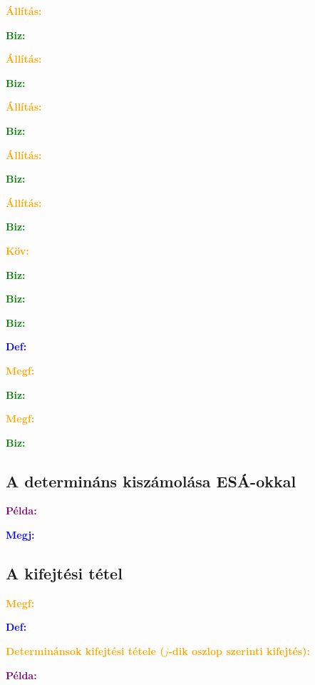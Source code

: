 \documentclass[../szamtud.tex]{subfiles}
\begin{document}
        \textcolor{orange}{\textbf{Állítás:}}

        \textcolor{green}{\textbf{Biz:}}

        \textcolor{orange}{\textbf{Állítás:}}

        \textcolor{green}{\textbf{Biz:}}

        \textcolor{orange}{\textbf{Állítás:}}

        \textcolor{green}{\textbf{Biz:}}

        \textcolor{orange}{\textbf{Állítás:}}

        \textcolor{green}{\textbf{Biz:}}

        \textcolor{orange}{\textbf{Állítás:}}

        \textcolor{green}{\textbf{Biz:}}

        \textcolor{orange}{\textbf{Köv:}}

        \textcolor{green}{\textbf{Biz:}}

        \textcolor{green}{\textbf{Biz:}}

        \textcolor{green}{\textbf{Biz:}}

        \textcolor{blue}{\textbf{Def:}}

        \textcolor{orange}{\textbf{Megf:}}

        \textcolor{green}{\textbf{Biz:}}

        \textcolor{orange}{\textbf{Megf:}}

        \textcolor{green}{\textbf{Biz:}}

    \subsection{A determináns kiszámolása ESÁ-okkal}

        \textcolor{purple}{\textbf{Példa:}} 

        \textcolor{blue}{\textbf{Megj:}}

    \subsection{A kifejtési tétel}

        \textcolor{orange}{\textbf{Megf:}}

        \textcolor{blue}{\textbf{Def:}}

        \textcolor{orange}{\textbf{Determinánsok kifejtési tétele ($j$-dik oszlop szerinti kifejtés):}}

        \textcolor{purple}{\textbf{Példa:}} 

        









        
\end{document}
